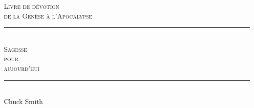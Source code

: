 
\newcommand{\HRule}{\rule{\linewidth}{0.2mm}}

\begin{titlepage}
\begin{center}
\mbox{}
\vfill
\textsc{\large Livre de dévotion\\de la Genèse à l'Apocalypse}
\\[1.5cm]
\HRule \\[0.4cm]
\textsc{ \Huge Sagesse\\ pour\\[0.4cm] aujourd'hui}\\[0.4cm]

\HRule \\[1.5cm]
{\LARGE Chuck Smith}\\[1.5cm]
\vfill
\mbox{}
\end{center}
\end{titlepage}


